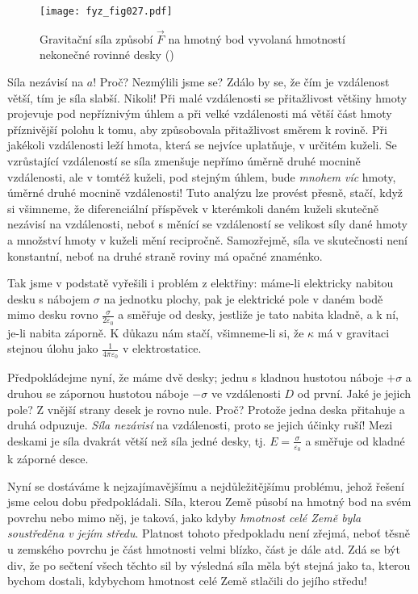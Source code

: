 {    \begin{figure}[ht!]  %
      \centering
      \texttt{[image: fyz\_fig027.pdf]}
      \caption{Gravitační síla způsobí \(\vec{F}\) na hmotný bod vyvolaná hmotností nekonečné 
               rovinné desky (\cite[s.~195]{Feynman01})}
      \label{fyz:fig027}
    \end{figure}
    Síla nezávisí na \(a\)! Proč? Nezmýlili jsme se? Zdálo by se, že čím je vzdálenost větší, tím 
    je síla slabší. Nikoli! Při malé vzdálenosti se přitažlivost většiny hmoty projevuje pod 
    nepříznivým úhlem a při velké vzdálenosti má větší část hmoty příznivější polohu k tomu, aby 
    způsobovala přitažlivost směrem k rovině. Při jakékoli vzdálenosti leží hmota, která se nejvíce 
    uplatňuje, v určitém kuželi. Se vzrůstající vzdáleností se síla zmenšuje nepřímo úměrně druhé 
    mocnině vzdálenosti, ale v tomtéž kuželi, pod stejným úhlem, bude \emph{mnohem víc} hmoty, 
    úměrné druhé mocnině vzdálenosti! Tuto analýzu lze provést přesně, stačí, když si všimneme, že 
    diferenciální příspěvek v kterémkoli daném kuželi skutečně nezávisí na vzdálenosti, neboť s 
    měnící se vzdáleností se velikost síly dané hmoty a množství hmoty v kuželi mění recipročně. 
    Samozřejmě, síla ve skutečnosti není konstantní, neboť na druhé straně roviny má opačné 
    znaménko.
    
   Tak jsme v podstatě vyřešili i problém z elektřiny: máme-li elektricky nabitou desku s nábojem 
    \(\sigma\) na jednotku plochy, pak je elektrické pole v daném bodě mimo desku rovno 
    \(\frac{\sigma}{2\varepsilon_0}\) a směřuje od desky, jestliže je tato nabita kladně, a k ní, 
    je-li nabita záporně. K důkazu nám stačí, všimneme-li si, že \(\kappa\) má v gravitaci stejnou 
    úlohu jako \(\frac{1}{4\pi\varepsilon_0}\) v elektrostatice.
    
    Předpokládejme nyní, že máme dvě desky; jednu s kladnou hustotou náboje \(+\sigma\) a druhou se 
    zápornou hustotou náboje \(-\sigma\) ve vzdálenosti \(D\) od první. Jaké je jejich pole? Z 
    vnější strany desek je rovno nule. Proč? Protože jedna deska přitahuje a druhá odpuzuje. 
    \emph{Síla nezávisí} na vzdálenosti, proto se jejich účinky ruší! Mezi deskami je síla dvakrát 
    větší než síla jedné desky, tj. \(E = \frac{\sigma}{\varepsilon_0}\) a směřuje od kladné k 
    záporné desce.
    
    Nyní se dostáváme k nejzajímavějšímu a nejdůležitějšímu problému, jehož řešení jsme celou dobu 
    předpokládali. Síla, kterou Země působí na hmotný bod na svém povrchu nebo mimo něj, je taková, 
    jako kdyby \emph{hmotnost celé Země byla soustředěna v jejím středu}. Platnost tohoto 
    předpokladu není zřejmá, neboť těsně u zemského povrchu je část hmotnosti velmi blízko, část je 
    dále atd. Zdá se být div, že po sečtení všech těchto sil by výsledná síla měla být stejná jako 
    ta, kterou bychom dostali, kdybychom hmotnost celé Země stlačili do jejího středu!
    
}
